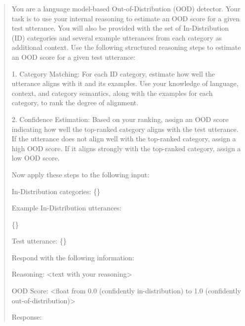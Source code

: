 \begin{quote}
You are a language model-based Out-of-Distribution (OOD) detector. Your task is to use your internal reasoning to estimate an OOD score for a given test utterance. You will also be provided with the set of In-Distribution (ID) categories and several example utterances from each category as additional context. Use the following structured reasoning steps to estimate an OOD score for a given test utterance:

1. Category Matching: For each ID category, estimate how well the utterance aligns with it and its examples. Use your knowledge of language, context, and category semantics, along with the examples for each category, to rank the degree of alignment.

2. Confidence Estimation: Based on your ranking, assign an OOD score indicating how well the top-ranked category aligns with the test utterance. If the utterance does not align well with the top-ranked category, assign a high OOD score. If it aligns strongly with the top-ranked category, assign a low OOD score.

Now apply these steps to the following input:

In-Distribution categories: \{\}

Example In-Distribution utterances:

\{\}

Test utterance: \{\}

Respond with the following information:

Reasoning: <text with your reasoning>

OOD Score: <float from 0.0 (confidently in-distribution) to 1.0 (confidently out-of-distribution)>

Response:
\end{quote}

